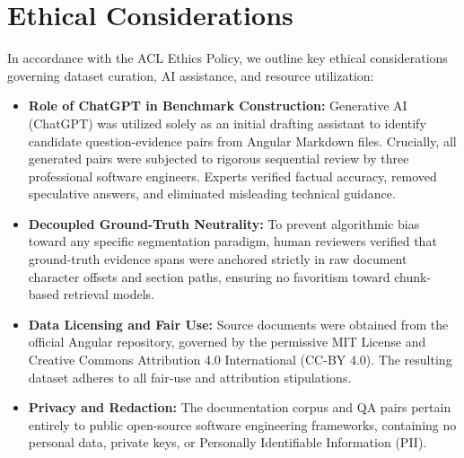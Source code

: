 
\section*{Ethical Considerations}
\label{sec:ethics}

In accordance with the ACL Ethics Policy, we outline key ethical considerations governing dataset curation, AI assistance, and resource utilization:

\begin{itemize}
    \item \textbf{Role of ChatGPT in Benchmark Construction:} Generative AI (ChatGPT) was utilized solely as an initial drafting assistant to identify candidate question-evidence pairs from Angular Markdown files. Crucially, all generated pairs were subjected to rigorous sequential review by three professional software engineers. Experts verified factual accuracy, removed speculative answers, and eliminated misleading technical guidance.
    
    \item \textbf{Decoupled Ground-Truth Neutrality:} To prevent algorithmic bias toward any specific segmentation paradigm, human reviewers verified that ground-truth evidence spans were anchored strictly in raw document character offsets and section paths, ensuring no favoritism toward chunk-based retrieval models.
    
    \item \textbf{Data Licensing and Fair Use:} Source documents were obtained from the official Angular repository, governed by the permissive MIT License and Creative Commons Attribution 4.0 International (CC-BY 4.0). The resulting dataset adheres to all fair-use and attribution stipulations.
    
    \item \textbf{Privacy and Redaction:} The documentation corpus and QA pairs pertain entirely to public open-source software engineering frameworks, containing no personal data, private keys, or Personally Identifiable Information (PII).
\end{itemize}
